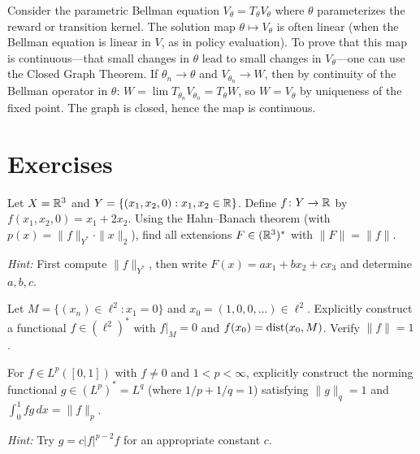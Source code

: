 \documentclass[11pt,a4paper]{article}
\begin{document}
\begin{rlconnection}[title={Closed Graph Theorem and Solution Map Continuity}]
Consider the parametric Bellman equation $V_\theta = T_\theta V_\theta$
where $\theta$ parameterizes the reward or transition kernel. The
solution map $\theta \mapsto V_\theta$ is often linear (when the
Bellman equation is linear in $V$, as in policy evaluation). To prove
that this map is continuous---that small changes in $\theta$ lead to
small changes in $V_\theta$---one can use the Closed Graph Theorem.
If $\theta_n \to \theta$ and $V_{\theta_n} \to W$, then by continuity
of the Bellman operator in $\theta$:
$W = \lim T_{\theta_n} V_{\theta_n} = T_\theta W$, so $W = V_\theta$
by uniqueness of the fixed point. The graph is closed, hence the map is
continuous.
\end{rlconnection}


\section{Exercises}
\label{sec:exercises}

\begin{exercise}
\label{ex:hb-finite}
Let $X = \mathbb{R}^3$ and $Y = \{(x_1, x_2, 0) : x_1, x_2 \in \mathbb{R}\}$. Define
$f \colon Y \to \mathbb{R}$ by $f(x_1, x_2, 0) = x_1 + 2x_2$. Using the
Hahn--Banach theorem (with $p(x) = \|f\|_{Y^*} \cdot \|x\|_2$), find
all extensions $F \in (\mathbb{R}^3)^*$ with $\|F\| = \|f\|$.

\noindent\textit{Hint:} First compute $\|f\|_{Y^*}$, then write
$F(x) = a x_1 + b x_2 + c x_3$ and determine $a, b, c$.
\end{exercise}

\begin{exercise}
\label{ex:separation}
Let $M = \{(x_n) \in \ell^2 : x_1 = 0\}$ and
$x_0 = (1, 0, 0, \ldots) \in \ell^2$. Explicitly construct a functional
$f \in (\ell^2)^*$ with $f|_M = 0$ and $f(x_0) = \operatorname{dist}(x_0, M)$.
Verify $\|f\| = 1$.
\end{exercise}

\begin{exercise}
\label{ex:norming-Lp}
For $f \in L^p([0,1])$ with $f \neq 0$ and $1 < p < \infty$, explicitly
construct the norming functional $g \in (L^p)^* = L^q$ (where
$1/p + 1/q = 1$) satisfying $\|g\|_q = 1$ and
$\int_0^1 f g\, dx = \|f\|_p$.

\noindent\textit{Hint:} Try $g = c |f|^{p-2} f$ for an appropriate
constant $c$.
\end{exercise}
\end{document}

